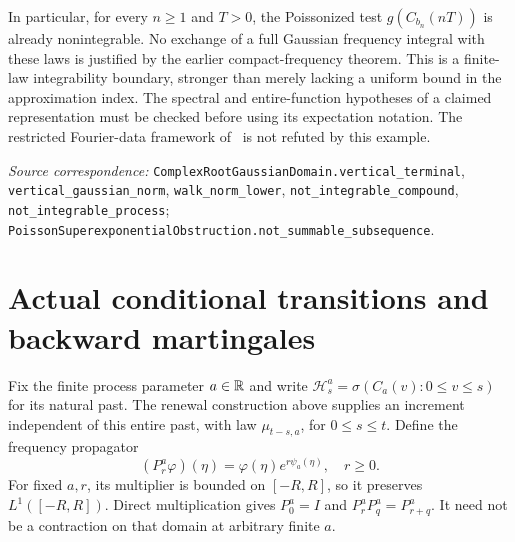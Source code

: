 \documentclass[11pt]{article}
\newcommand{\code}[1]{{\small\nolinkurl{#1}}}
\begin{document}
In particular, for every $n\geq1$ and $T>0$, the Poissonized test
$g(C_{b_n}(nT))$ is already nonintegrable. No exchange of a full
Gaussian frequency integral with these laws is justified by the earlier
compact-frequency theorem. This is a finite-law integrability boundary,
stronger than merely lacking a uniform bound in the approximation
index. The spectral and entire-function hypotheses of a claimed
representation must be checked before using its expectation notation.
The restricted Fourier-data framework of~\cite{BM} is not refuted by
this example.
\par\smallskip\begingroup\small\raggedright
\textit{Source correspondence:} \code{ComplexRootGaussianDomain.vertical_terminal},
\code{vertical_gaussian_norm}, \code{walk_norm_lower},
\code{not_integrable_compound}, \code{not_integrable_process};
\code{PoissonSuperexponentialObstruction.not_summable_subsequence}.
\par\endgroup

\section{Actual conditional transitions and backward martingales}
Fix the finite process parameter $a\in\mathbb R$ and write
$\mathcal H_s^a=\sigma(C_a(v):0\leq v\leq s)$ for its natural past.
The renewal construction above supplies an increment independent of
this entire past, with law $\mu_{t-s,a}$, for $0\leq s\leq t$.
Define the frequency propagator
\[
 (P_r^a\varphi)(\eta)=\varphi(\eta)e^{r\psi_a(\eta)},\quad r\geq0.
\]
For fixed $a,r$, its multiplier is bounded on $[-R,R]$, so it preserves
$L^1([-R,R])$. Direct multiplication gives $P_0^a=I$ and
$P_r^aP_q^a=P_{r+q}^a$. It need not be a contraction on that domain
at arbitrary finite $a$.
\end{document}
